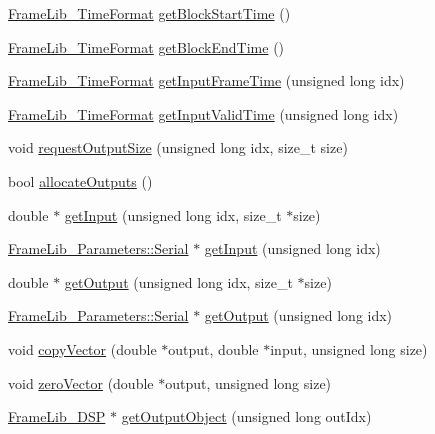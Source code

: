 \begin{DoxyCompactItemize}
\item 
\hyperlink{_frame_lib___types_8h_a699a4071a9eaaa283906a5ebd0a79ac0}{Frame\+Lib\+\_\+\+Time\+Format} \hyperlink{class_frame_lib___d_s_p_a198525cf76c51488a37b9fac8e2a21ed}{get\+Block\+Start\+Time} ()
\item 
\hyperlink{_frame_lib___types_8h_a699a4071a9eaaa283906a5ebd0a79ac0}{Frame\+Lib\+\_\+\+Time\+Format} \hyperlink{class_frame_lib___d_s_p_a5f80e7fbe15189dc9c16323dcf654cbd}{get\+Block\+End\+Time} ()
\item 
\hyperlink{_frame_lib___types_8h_a699a4071a9eaaa283906a5ebd0a79ac0}{Frame\+Lib\+\_\+\+Time\+Format} \hyperlink{class_frame_lib___d_s_p_ab50bdad21f69e0ed9d33ef25ee830b0c}{get\+Input\+Frame\+Time} (unsigned long idx)
\item 
\hyperlink{_frame_lib___types_8h_a699a4071a9eaaa283906a5ebd0a79ac0}{Frame\+Lib\+\_\+\+Time\+Format} \hyperlink{class_frame_lib___d_s_p_ae3ea3b2eb636656ee7dd13d99d351e85}{get\+Input\+Valid\+Time} (unsigned long idx)
\item 
void \hyperlink{class_frame_lib___d_s_p_a018be5346f473c3c21d5251d6acb85c7}{request\+Output\+Size} (unsigned long idx, size\+\_\+t size)
\item 
bool \hyperlink{class_frame_lib___d_s_p_abbf404ed95c61cfa713c988b10f76202}{allocate\+Outputs} ()
\item 
double $\ast$ \hyperlink{class_frame_lib___d_s_p_a1d139d046d9269f9f6ac34c8ee8ab516}{get\+Input} (unsigned long idx, size\+\_\+t $\ast$size)
\item 
\hyperlink{class_frame_lib___parameters_1_1_serial}{Frame\+Lib\+\_\+\+Parameters\+::\+Serial} $\ast$ \hyperlink{class_frame_lib___d_s_p_a6212469bed2fe6d4a994062bc85db98f}{get\+Input} (unsigned long idx)
\item 
double $\ast$ \hyperlink{class_frame_lib___d_s_p_a0b93f60dad1696bfbb80cedb5d406c40}{get\+Output} (unsigned long idx, size\+\_\+t $\ast$size)
\item 
\hyperlink{class_frame_lib___parameters_1_1_serial}{Frame\+Lib\+\_\+\+Parameters\+::\+Serial} $\ast$ \hyperlink{class_frame_lib___d_s_p_a614a975377a289f8bdaa2eba0c1c41b6}{get\+Output} (unsigned long idx)
\item 
void \hyperlink{class_frame_lib___d_s_p_a811ee9a6e985621da2f849ce4a96b7ba}{copy\+Vector} (double $\ast$output, double $\ast$input, unsigned long size)
\item 
void \hyperlink{class_frame_lib___d_s_p_a73f63a346affb7c00123a99643f36de3}{zero\+Vector} (double $\ast$output, unsigned long size)
\item 
\hyperlink{class_frame_lib___d_s_p}{Frame\+Lib\+\_\+\+D\+SP} $\ast$ \hyperlink{class_frame_lib___d_s_p_a867822cfa9e3ca491c886cff9f79001d}{get\+Output\+Object} (unsigned long out\+Idx)
\end{DoxyCompactItemize}
